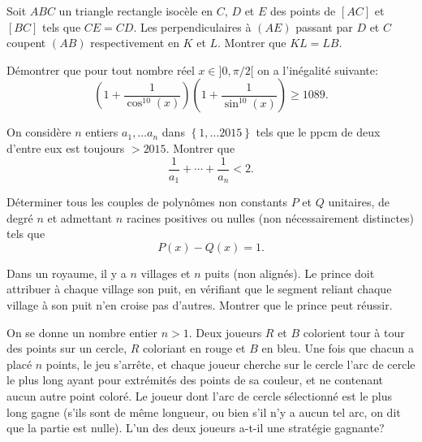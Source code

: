 \begin{exo}{}Soit $ABC$ un triangle rectangle isocèle en $C$, $D$ et $E$ des points de $[AC]$ et $[BC]$ tels que $CE=CD$. Les perpendiculaires à $(AE)$ passant par $D$ et $C$ coupent $(AB)$ respectivement en $K$ et $L$. Montrer que $KL=LB$.
\end{exo}


\begin{exo}{}Démontrer que pour tout nombre réel $x \in ]0, \pi/2[$ on a l'inégalité suivante:
$$ \left( 1+ \frac{1}{\cos^{10}(x)} \right)  \left( 1+ \frac{1}{\sin^{10}(x)} \right) \geq 1089.$$
\end{exo}

\begin{exo}{}
On considère $n$ entiers $a_{1},\ldots a_{n}$
dans $\left\{ 1,\ldots2015\right\} $ tels que le ppcm de deux d'entre
eux est toujours $>2015$. Montrer que 
\[
\frac{1}{a_{1}}+\cdots+\frac{1}{a_{n}}<2.
\]
\end{exo}

\begin{exo}{}Déterminer tous les couples de polynômes non constants $P$ et $Q$ unitaires, de degré $n$ et admettant $n$ racines positives ou nulles (non nécessairement distinctes) tels que
$$P(x) - Q(x) = 1.$$
\end{exo}

\begin{exo}{}
 Dans un royaume, il y a $n$ villages et $n$ puits (non alignés). Le prince doit attribuer à chaque village son puit, en vérifiant que le segment reliant chaque village à son puit n'en croise pas d'autres. Montrer que le prince peut réussir.
\end{exo}

\begin{exo}{}On se donne un nombre entier $n>1$. Deux joueurs $R$ et $B$ colorient tour à tour des points sur un cercle, $R$ coloriant en rouge et $B$ en bleu. Une fois que chacun a placé $n$ points, le jeu s'arrête, et chaque joueur cherche sur le cercle l'arc de cercle le plus long ayant pour extrémités des points de sa couleur, et ne contenant aucun autre point coloré. Le joueur dont l'arc de cercle sélectionné est le plus long gagne (s'ils sont de même longueur, ou bien s'il n'y a aucun tel arc, on dit que la partie est nulle). L'un des deux joueurs a-t-il une stratégie gagnante?
\end{exo}

